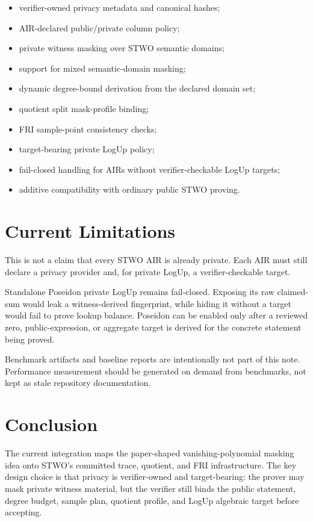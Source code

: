 \documentclass[11pt]{article}
\begin{document}
\begin{itemize}
    \item verifier-owned privacy metadata and canonical hashes;
    \item AIR-declared public/private column policy;
    \item private witness masking over STWO semantic domains;
    \item support for mixed semantic-domain masking;
    \item dynamic degree-bound derivation from the declared domain set;
    \item quotient split mask-profile binding;
    \item FRI sample-point consistency checks;
    \item target-bearing private LogUp policy;
    \item fail-closed handling for AIRs without verifier-checkable LogUp targets;
    \item additive compatibility with ordinary public STWO proving.
\end{itemize}

\section{Current Limitations}

This is not a claim that every STWO AIR is already private. Each AIR must still
declare a privacy provider and, for private LogUp, a verifier-checkable target.

Standalone Poseidon private LogUp remains fail-closed. Exposing its raw
claimed-sum would leak a witness-derived fingerprint, while hiding it without a
target would fail to prove lookup balance. Poseidon can be enabled only after a
reviewed zero, public-expression, or aggregate target is derived for the concrete
statement being proved.

Benchmark artifacts and baseline reports are intentionally not part of this note.
Performance measurement should be generated on demand from benchmarks, not kept
as stale repository documentation.

\section{Conclusion}

The current integration maps the paper-shaped vanishing-polynomial masking idea
onto STWO's committed trace, quotient, and FRI infrastructure. The key design
choice is that privacy is verifier-owned and target-bearing: the prover may mask
private witness material, but the verifier still binds the public statement,
degree budget, sample plan, quotient profile, and LogUp algebraic target before
accepting.
\end{document}
